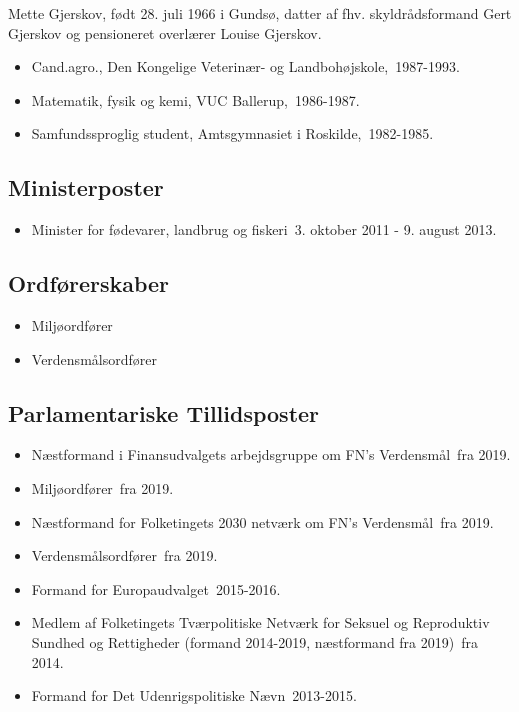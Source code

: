 \documentclass[11pt, a4paper]{awesome-cv}
\begin{document}
\makecvheader[R]
\makelettertitle
\begin{cvletter}
Mette Gjerskov, født 28. juli 1966 i Gundsø, datter af fhv. skyldrådsformand Gert Gjerskov og pensioneret overlærer Louise Gjerskov.

\begin{itemize}
\item Cand.agro., Den Kongelige Veterinær- og Landbohøjskole, 1987-1993.
\item Matematik, fysik og kemi, VUC Ballerup, 1986-1987.
\item Samfundssproglig student, Amtsgymnasiet i Roskilde, 1982-1985.
\end{itemize}
\subsection*{Ministerposter}
\begin{itemize}
\item Minister for fødevarer, landbrug og fiskeri 3. oktober 2011 - 9. august 2013.
\end{itemize}
\subsection*{Ordførerskaber}
\begin{itemize}
\item Miljøordfører
\item Verdensmålsordfører
\end{itemize}
\subsection*{Parlamentariske Tillidsposter}
\begin{itemize}
\item Næstformand i Finansudvalgets arbejdsgruppe om FN's Verdensmål fra 2019.
\item Miljøordfører fra 2019.
\item Næstformand for Folketingets 2030 netværk om FN's Verdensmål fra 2019.
\item Verdensmålsordfører fra 2019.
\item Formand for Europaudvalget 2015-2016.
\item Medlem af Folketingets Tværpolitiske Netværk for Seksuel og Reproduktiv Sundhed og Rettigheder (formand 2014-2019, næstformand fra 2019) fra 2014.
\item Formand for Det Udenrigspolitiske Nævn 2013-2015.
\end{itemize}

\end{cvletter}
\end{document}
